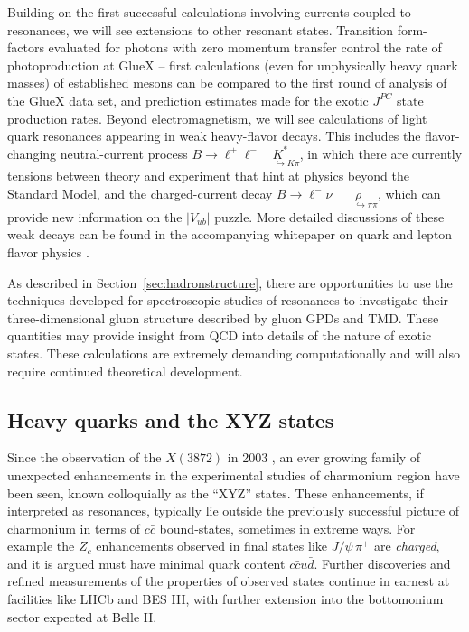 Building on the first successful calculations involving currents coupled to resonances, we will see extensions to other resonant states. Transition form-factors evaluated for photons with zero momentum transfer control the rate of photoproduction at GlueX -- first calculations (even for unphysically heavy quark masses) of established mesons can be compared to the first round of analysis of the GlueX data set, and prediction estimates made for the exotic $J^{PC}$ state production rates. Beyond electromagnetism, we will see calculations of light quark resonances appearing in weak heavy-flavor decays. This includes the flavor-changing neutral-current process $B \to \ell^+\ell^- \!\!\!\! \underset{\;\;\;\;\;\hookrightarrow K\pi}{K^*}$, in which there are currently tensions between theory and experiment that hint at physics beyond the Standard Model, and the charged-current decay $B \to \ell^-\bar{\nu}  \!\!\!\!\!\!\!\!\;\;\underset{\;\;\;\;\;\;\hookrightarrow \pi\pi}{\rho}$, which can provide new information on the $|V_{ub}|$ puzzle. More detailed discussions of these weak decays can be found in
the accompanying whitepaper on quark and lepton flavor physics \cite{Lehner:2019wvv}.

As described in Section~\ref{sec:hadronstructure}, there are opportunities to use the techniques developed for spectroscopic studies of resonances to investigate their three-dimensional gluon structure described by gluon GPDs and TMD. These quantities may provide insight from QCD into details of the nature of exotic states. These calculations are extremely demanding computationally and will also require continued theoretical development.






\subsection{Heavy quarks and the XYZ states}

Since the  observation of the $X(3872)$ in 2003 \cite{Choi:2003ue}, an ever growing family of unexpected enhancements in the experimental studies of charmonium region have been seen, known colloquially as the ``XYZ'' states. These enhancements, if interpreted as resonances, typically lie outside the previously successful picture of charmonium in terms of $c\bar{c}$ bound-states, sometimes in extreme ways. For example the $Z_c$ enhancements observed in final states like $J/\psi \, \pi^+$ are \emph{charged}, and it is argued must have minimal quark content $c\bar{c} u \bar{d}$. Further discoveries and refined measurements of the properties of observed states continue in earnest at facilities like LHCb and BES III, with further extension into the bottomonium sector expected at Belle II.

